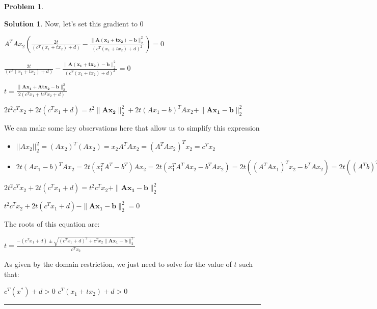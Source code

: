 \documentclass{article}
\theoremstyle{definition}
\newtheorem{problem}{Problem}
\def\fline{\rule{0.75\linewidth}{0.5pt}}
\newcommand{\finishline}{\begin{center}\fline\end{center}}
\newtheorem*{solution*}{Solution}
\newenvironment{solution}{\begin{solution*}}{{\finishline} \end{solution*}}
\begin{document}
\begin{problem}
\begin{enumerate}
\begin{solution}
        
        Now, let's set this gradient to 0 \newline 

        $A^TAx_2 (\frac{2t}{(c^T(x_1 + tx_2) + d)} - \frac{\|\mathbf{A(x_1 + tx_2) - b}\|^2_2}{(c^T(x_1 + tx_2) + d) ^ 2}) = 0$ \newline 

        $\frac{2t}{(c^T(x_1 + tx_2) + d)} - \frac{\|\mathbf{A(x_1 + tx_2) - b}\|^2_2}{(c^T(x_1 + tx_2) + d) ^ 2} = 0$ \newline 

         $t = \frac{\|\mathbf{Ax_1 + Atx_2 - b}\|^2_2 }{2(c^Tx_1 + tc^Tx_2 + d)}$ \newline 


         $2t^2 c^Tx_2 + 2t(c^Tx_1 + d) = t^2 \|\mathbf{Ax_2}\|^2_2 + 2t(Ax_1 - b)^T Ax_2 +  \|\mathbf{Ax_1 - b}\|^2_2 $ \newline 

         We can make some key observations here that allow us to simplify this expression
         
         \begin{itemize}
             \item $||Ax_2||^2_2 = (Ax_2)^T(Ax_2) = x_2A^TAx_2 = (A^TAx_2)^T x_2 = c^T x_2$
             \item $2t(Ax_1 - b)^TAx_2 = 2t(x_1^TA^T - b^T)Ax_2 = 2t(x_1^TA^TAx_2 - b^TAx_2) = 2t((A^TAx_1)^Tx_2 - b^TAx_2) = 2t((A^Tb)^Tx_2 - b^TAx_2) = 2t(b^TAx_2 - b^TAx_2) = 0$
         \end{itemize}

         $2t^2 c^Tx_2 + 2t(c^Tx_1 + d) = t^2 c^T x_2 +  \|\mathbf{Ax_1 - b}\|^2_2 $ \newline 

         $t^2 c^Tx_2 + 2t(c^Tx_1 + d) - \|\mathbf{Ax_1 - b}\|^2_2  = 0 $ \newline 

         The roots of this equation are: \newline 

         $t = \frac{-(c^Tx_1 + d) \pm \sqrt{(c^Tx_1 + d)^2 + c^Tx_2 \|\mathbf{Ax_1 - b}\|^2_2}}{c^Tx_2}$

        As given by the domain restriction, we just need to solve for the value of $t$ such that: \newline 

        $c^T(x^*) + d > 0$ \newline 
        $c^T(x_1 + tx_2) + d > 0$ \newline 


\end{solution}
\end{enumerate}
\end{problem}
\end{document}
